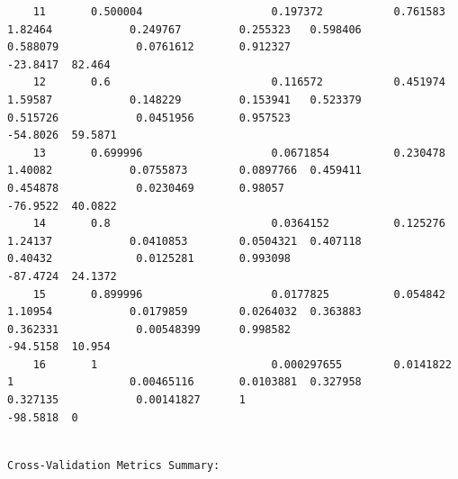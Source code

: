 \documentclass[11pt]{article}
\begin{document}
\begin{verbatim}
    11       0.500004                    0.197372           0.761583   1.82464            0.249767         0.255323   0.598406                    0.588079            0.0761612       0.912327                   -23.8417  82.464
    12       0.6                         0.116572           0.451974   1.59587            0.148229         0.153941   0.523379                    0.515726            0.0451956       0.957523                   -54.8026  59.5871
    13       0.699996                    0.0671854          0.230478   1.40082            0.0755873        0.0897766  0.459411                    0.454878            0.0230469       0.98057                    -76.9522  40.0822
    14       0.8                         0.0364152          0.125276   1.24137            0.0410853        0.0504321  0.407118                    0.40432             0.0125281       0.993098                   -87.4724  24.1372
    15       0.899996                    0.0177825          0.054842   1.10954            0.0179859        0.0264032  0.363883                    0.362331            0.00548399      0.998582                   -94.5158  10.954
    16       1                           0.000297655        0.0141822  1                  0.00465116       0.0103881  0.327958                    0.327135            0.00141827      1                          -98.5818  0
    \end{verbatim}

    
    \begin{Verbatim}[commandchars=\\\{\}]

Cross-Validation Metrics Summary: 

    \end{Verbatim}
\end{document}
